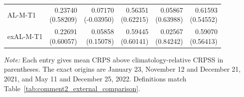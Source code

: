 \begin{table}[!htbp]
\begin{threeparttable}
\begin{tabular}{lrrrrr}
AL-M-T1 & \shortstack[r]{0.23740\\(0.58209)} & \shortstack[r]{0.07170\\(-0.03950)} & \shortstack[r]{0.56351\\(0.62215)} & \shortstack[r]{0.05867\\(0.63988)} & \shortstack[r]{0.61593\\(0.54552)} \\
exAL-M-T1 & \shortstack[r]{0.22691\\(0.60057)} & \shortstack[r]{0.05858\\(0.15078)} & \shortstack[r]{0.59445\\(0.60141)} & \shortstack[r]{0.02567\\(0.84242)} & \shortstack[r]{0.59070\\(0.56413)} \\
\hline
\end{tabular}
\begin{tablenotes}
\fontsize{8}{10}\selectfont
\item \textit{Note:} Each entry gives mean CRPS above climatology-relative CRPSS in parentheses. The exact origins are January 23, November 12 and December 21, 2021, and May 11 and December 25, 2022. Definitions match Table~\ref{tab:comment2_external_comparison}.
\end{tablenotes}
\end{threeparttable}
\end{table}
